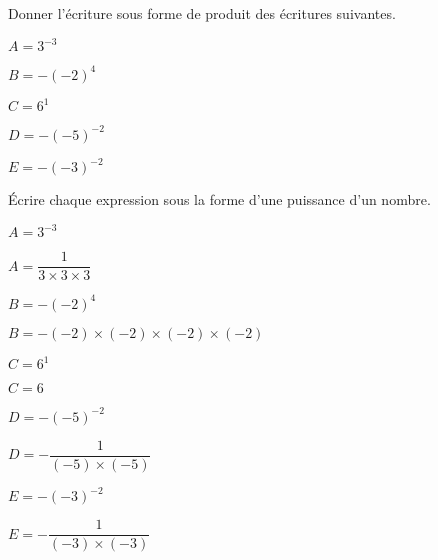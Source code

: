 \begin{exercice*}
    Donner l'écriture sous forme de produit des écritures suivantes.
    \begin{multicols}{2}
        \begin{itemize}
            \begin{spacing}{1.5}
                \item[] $A=3^{-3}$
                \item[] $B=-(-2)^{4}$
                \item[] $C=6^{1}$
                \item[] $D=-(-5)^{-2}$
                \item[] $E=-(-3)^{-2}$
            \end{spacing}
        \end{itemize}
    \end{multicols}
\end{exercice*}
\begin{corrige}
    Écrire chaque expression sous la forme d'une puissance d'un nombre.
    \begin{list}{}{}
        \item[] $A=3^{-3}$
        
        {\red $A=\dfrac{1}{3\times3\times3}$}
        \item[] $B=-(-2)^{4}$
        
        {\red $B=-(-2)\times(-2)\times(-2)\times(-2)$}
        \item[] $C=6^{1}$
        
        {\red $C=6$}
        \item[] $D=-(-5)^{-2}$
        
        {\red $D=-\dfrac{1}{(-5)\times(-5)}$}
        \item[] $E=-(-3)^{-2}$
        
        {\red $E= -\dfrac{1}{(-3)\times(-3)}$}
    \end{list}
\end{corrige}